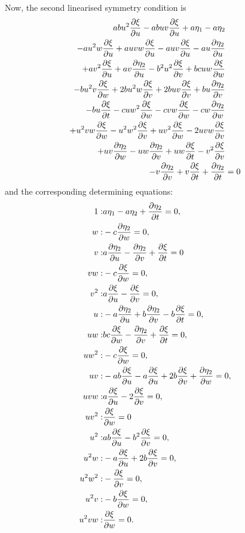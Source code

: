 Now, the second linearised symmetry condition is
\begin{align}
  a b u^{2} \pdv{\xi}{u} - a b u v \pdv{\xi}{u} + a \eta_1 - a \eta_2&\nonumber\\
  - a u^{2} w \pdv{\xi}{u} + a u v w \pdv{\xi}{u} - a u v \pdv{\xi}{u} - a u \pdv{\eta_2}{u}&\nonumber\\
  + a v^{2} \pdv{\xi}{u} + a v \pdv{\eta_2}{u} - b^{2} u^{2} \pdv{\xi}{v} + b c u w \pdv{\xi}{w}&\nonumber\\
  - b u^{2} v \pdv{\xi}{w} + 2 b u^{2} w \pdv{\xi}{v} + 2 b u v \pdv{\xi}{v} + b u \pdv{\eta_2}{v}&\nonumber\\
  - b u \pdv{\xi}{t} - c u w^{2} \pdv{\xi}{w} - c v w \pdv{\xi}{w} - c w \pdv{\eta_2}{w}&\nonumber\\
  + u^{2} v w \pdv{\xi}{w} - u^{2} w^{2} \pdv{\xi}{v} + u v^{2} \pdv{\xi}{w} - 2 u v w \pdv{\xi}{v}&\nonumber\\
  + u v \pdv{\eta_2}{w} - u w \pdv{\eta_2}{v} + u w \pdv{\xi}{t} - v^{2} \pdv{\xi}{v}&\nonumber\\
  - v \pdv{\eta_2}{v} + v \pdv{\xi}{t} + \pdv{\eta_2}{t}&=0\label{eq:Lorenz_lin_sym_2}
\end{align}
and the corresponding determining equations:
\begin{align}
1:&a \eta_1 - a \eta_2 + \pdv{\eta_2}{t}=0,\\
w:&- c \pdv{\eta_2}{w}=0,\\
v:&a \pdv{\eta_2}{u} - \pdv{\eta_2}{v} + \pdv{\xi}{t}=0\\
v w:&- c \pdv{\xi}{w}=0,\\
v^{2}:&a \pdv{\xi}{u} - \pdv{\xi}{v}=0,\\
u:&- a \pdv{\eta_2}{u} + b \pdv{\eta_2}{v} - b \pdv{\xi}{t}=0,\\
u w:&b c \pdv{\xi}{w} - \pdv{\eta_2}{v} + \pdv{\xi}{t}=0,\\
u w^{2}:&- c \pdv{\xi}{w}=0,\\
u v:&- a b \pdv{\xi}{u} - a \pdv{\xi}{u} + 2 b \pdv{\xi}{v} + \pdv{\eta_2}{w}=0,\\
u v w:&a \pdv{\xi}{u} - 2 \pdv{\xi}{v}=0,\\
u v^{2}:&\pdv{\xi}{w}=0\\
u^{2}:&a b \pdv{\xi}{u} - b^{2} \pdv{\xi}{v}=0,\\
u^{2} w:&- a \pdv{\xi}{u} + 2 b \pdv{\xi}{v}=0,\\
u^{2} w^{2}:&- \pdv{\xi}{v}=0,\\
u^{2} v:&- b \pdv{\xi}{w}=0,\\
u^{2} v w:&\pdv{\xi}{w}=0.
\end{align}
